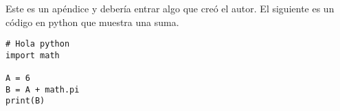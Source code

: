 Este es un apéndice y debería entrar algo que creó el autor. El siguiente es un código en python que muestra una suma.\\

\begin{lstlisting}
# Hola python
import math

A = 6
B = A + math.pi
print(B)
\end{lstlisting}
